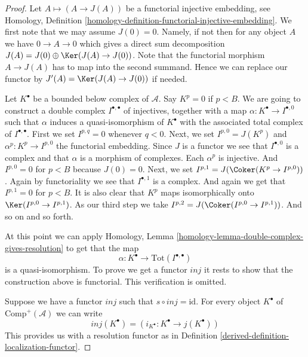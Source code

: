 \begin{proof}

Let $A \mapsto (A \to J(A))$ be a functorial injective embedding, see
Homology, Definition \ref{homology-definition-functorial-injective-embedding}.
We first note that we may assume $J(0) = 0$. Namely, if not then
for any object $A$ we have $0 \to A \to 0$ which gives
a direct sum decomposition $J(A) = J(0) \oplus \Ker(J(A) \to J(0))$.
Note that the functorial morphism $A \to J(A)$ has to map
into the second summand. Hence we can replace our functor
by $J'(A) = \Ker(J(A) \to J(0))$ if needed.

\medskip\noindent
Let $K^\bullet$ be a bounded below complex of $\mathcal{A}$.
Say $K^p = 0$ if $p < B$.
We are going to construct a double complex $I^{\bullet, \bullet}$
of injectives, together with a map $\alpha : K^\bullet \to I^{\bullet, 0}$
such that $\alpha$ induces a quasi-isomorphism of $K^\bullet$
with the associated total complex of $I^{\bullet, \bullet}$.
First we set $I^{p, q} = 0$ whenever $q < 0$.
Next, we set $I^{p, 0} = J(K^p)$ and $\alpha^p : K^p \to I^{p, 0}$
the functorial embedding. Since $J$ is a functor we see that
$I^{\bullet, 0}$ is a complex and that $\alpha$ is a
morphism of complexes. Each $\alpha^p$ is injective. And
$I^{p, 0} = 0$ for $p < B$ because $J(0) = 0$. Next, we set
$I^{p, 1} = J(\Coker(K^p \to I^{p, 0}))$. Again by functoriality
we see that $I^{\bullet, 1}$ is a complex. And again we get
that $I^{p, 1} = 0$ for $p < B$. It is also clear that
$K^p$ maps isomorphically onto $\Ker(I^{p, 0} \to I^{p, 1})$.
As our third step we take $I^{p, 2} = J(\Coker(I^{p, 0} \to I^{p, 1}))$.
And so on and so forth.

\medskip\noindent
At this point we can apply
Homology, Lemma \ref{homology-lemma-double-complex-gives-resolution}
to get that the map
$$
\alpha : K^\bullet \longrightarrow \text{Tot}(I^{\bullet, \bullet})
$$
is a quasi-isomorphism. To prove we get a functor $inj$ it
rests to show that the construction above
is functorial. This verification is omitted.

\medskip\noindent
Suppose we have a functor $inj$ such that $s \circ inj = \text{id}$.
For every object $K^\bullet$ of $\text{Comp}^{+}(\mathcal{A})$
we can write
$$
inj(K^\bullet) = (i_{K^\bullet} : K^\bullet \to j(K^\bullet))
$$
This provides us with a resolution functor as in
Definition \ref{derived-definition-localization-functor}.
\end{proof}

